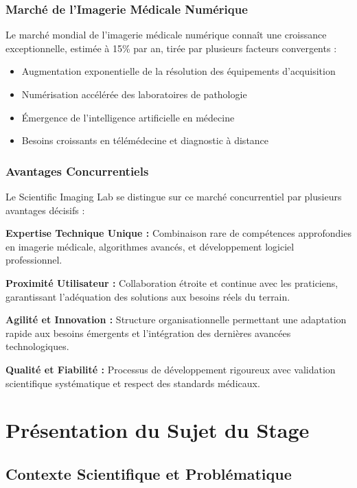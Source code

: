 \documentclass[12pt,a4paper]{article}
\begin{document}
\subsubsection{Marché de l'Imagerie Médicale Numérique}

Le marché mondial de l'imagerie médicale numérique connaît une croissance exceptionnelle, estimée à 15\% par an, tirée par plusieurs facteurs convergents :

\begin{itemize}
\item Augmentation exponentielle de la résolution des équipements d'acquisition
\item Numérisation accélérée des laboratoires de pathologie
\item Émergence de l'intelligence artificielle en médecine
\item Besoins croissants en télémédecine et diagnostic à distance
\end{itemize}

\subsubsection{Avantages Concurrentiels}

Le Scientific Imaging Lab se distingue sur ce marché concurrentiel par plusieurs avantages décisifs :

\textbf{Expertise Technique Unique :} Combinaison rare de compétences approfondies en imagerie médicale, algorithmes avancés, et développement logiciel professionnel.

\textbf{Proximité Utilisateur :} Collaboration étroite et continue avec les praticiens, garantissant l'adéquation des solutions aux besoins réels du terrain.

\textbf{Agilité et Innovation :} Structure organisationnelle permettant une adaptation rapide aux besoins émergents et l'intégration des dernières avancées technologiques.

\textbf{Qualité et Fiabilité :} Processus de développement rigoureux avec validation scientifique systématique et respect des standards médicaux.

\newpage

\section{Présentation du Sujet du Stage}

\subsection{Contexte Scientifique et Problématique}
\end{document}

